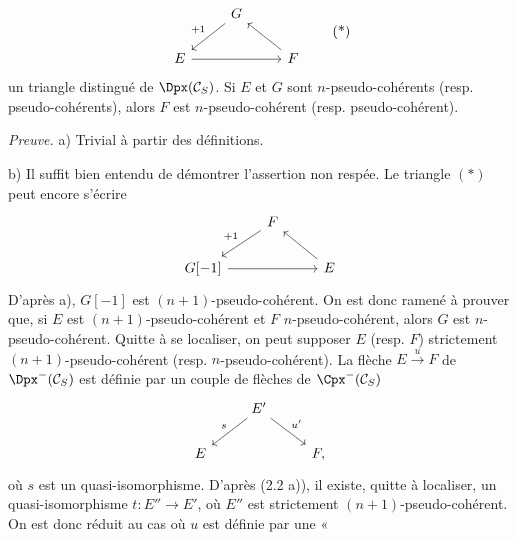 \[
\begin{tikzcd}
& G \arrow[dl,"+1"'] & \\
E \arrow[rr] && F \arrow[ul]
\end{tikzcd}
\tag{*}
\]
un
triangle distingué de \(\Dpx(\mathcal C_S)\). Si \(E\) et \(G\) sont \(n\)-pseudo-cohérents (resp. pseudo-cohérents), alors \(F\) est \(n\)-pseudo-cohérent (resp. pseudo-cohérent).

\emph{Preuve.} a) Trivial à partir des définitions.

b) Il suffit bien entendu de démontrer l'assertion non respée. Le triangle \((*)\) peut encore s'écrire
\[
\begin{tikzcd}
& F \arrow[dl,"+1"'] & \\
G[-1] \arrow[rr] && E \arrow[ul]
\end{tikzcd}
\]
D'après a), \(G[-1]\) est \((n+1)\)-pseudo-cohérent. On est donc ramené à prouver que, si \(E\) est \((n+1)\)-pseudo-cohérent et \(F\) \(n\)-pseudo-cohérent, alors \(G\) est \(n\)-pseudo-cohérent. Quitte à se localiser, on peut supposer \(E\) (resp. \(F\)) strictement \((n+1)\)-pseudo-cohérent (resp. \(n\)-pseudo-cohérent). La flèche \(E\xrightarrow{u}F\) de \(\Dpx^-(\mathcal C_S)\) est définie par un couple de flèches de \(\Cpx^-(\mathcal C_S)\)
\[
\begin{tikzcd}
& E' \arrow[dl,"s"'] \arrow[dr,"u'"]\\
E && F ,
\end{tikzcd}
\]
où \(s\) est un quasi-isomorphisme. D'après (2.2 a)), il existe, quitte à localiser, un quasi-isomorphisme \(t:E''\to E'\), où \(E''\) est strictement \((n+1)\)-pseudo-cohérent. On est donc réduit au cas où \(u\) est définie par une «
